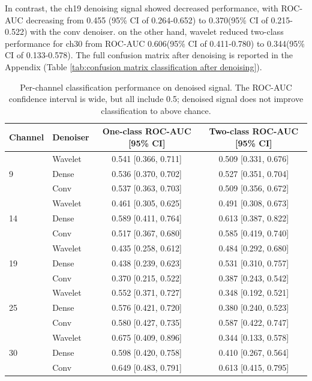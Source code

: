 \documentclass[ %
                    author={Rzan Alkabier},
                    supervisor={Dr. Zahraa Abdallah},
                    degree={MSc},
                     title={Denoising Extracellular Recording for Spike Detection and Classification on Single Channels},
                    subtitle={Does denoising improve detection and classification performance?},
                      type={},
                      year={2026}]{dissertation}
\begin{document}
\noindent
In contrast, the ch19 denoising signal showed decreased performance, with ROC-AUC decreasing from 0.455 (95\% CI of 0.264-0.652) to 0.370(95\% CI of 0.215-0.522) with the conv denoiser. on the other hand, wavelet reduced two-class performance for ch30 from ROC-AUC 0.606(95\% CI of 0.411-0.780) to 0.344(95\% CI of 0.133-0.578). The full confusion matrix after denoising is reported in the Appendix (Table \ref{tab:confusion matrix classification after denoising}). 
\begin{table}[H]
    \centering
    \begin{tabular}{llcc}
    \toprule
    Channel & Denoiser & One-class ROC-AUC [95\% CI] & Two-class ROC-AUC [95\% CI] \\
    \midrule
    \multirow{3}{*}{9}  
    & Wavelet & 0.541 [0.366, 0.711] & 0.509 [0.331, 0.676] \\
    & Dense & 0.536 [0.370, 0.702] & 0.527 [0.351, 0.704] \\
    & Conv & 0.537 [0.363, 0.703] & 0.509 [0.356, 0.672] \\
    \midrule
    \multirow{3}{*}{14} 
    & Wavelet & 0.461 [0.305, 0.625] & 0.491 [0.308, 0.673] \\
    & Dense & 0.589 [0.411, 0.764] & 0.613 [0.387, 0.822] \\
    & Conv & 0.517 [0.367, 0.680] & 0.585 [0.419, 0.740] \\
    \midrule
    \multirow{3}{*}{19} 
    & Wavelet & 0.435 [0.258, 0.612] & 0.484 [0.292, 0.680] \\
    & Dense & 0.438 [0.239, 0.623] & 0.531 [0.310, 0.757] \\
    & Conv & 0.370 [0.215, 0.522] & 0.387 [0.243, 0.542] \\
    \midrule
    \multirow{3}{*}{25} 
    & Wavelet & 0.552 [0.371, 0.727] & 0.348 [0.192, 0.521] \\
    & Dense & 0.576 [0.421, 0.720] & 0.380 [0.240, 0.523] \\
    & Conv & 0.580 [0.427, 0.735] & 0.587 [0.422, 0.747] \\
    \midrule
    \multirow{3}{*}{30} 
    & Wavelet & 0.675 [0.409, 0.896] & 0.344 [0.133, 0.578] \\
    & Dense & 0.598 [0.420, 0.758] & 0.410 [0.267, 0.564] \\
    & Conv & 0.649 [0.483, 0.791] & 0.613 [0.415, 0.795] \\
    \bottomrule
    \end{tabular}
    \caption {Per-channel classification performance on denoised signal. The ROC-AUC confidence interval is wide, but all include 0.5; denoised signal does not improve classification to above chance.}
    \label{tab:classificatio-roc denoised}
\end{table}
\end{document}
